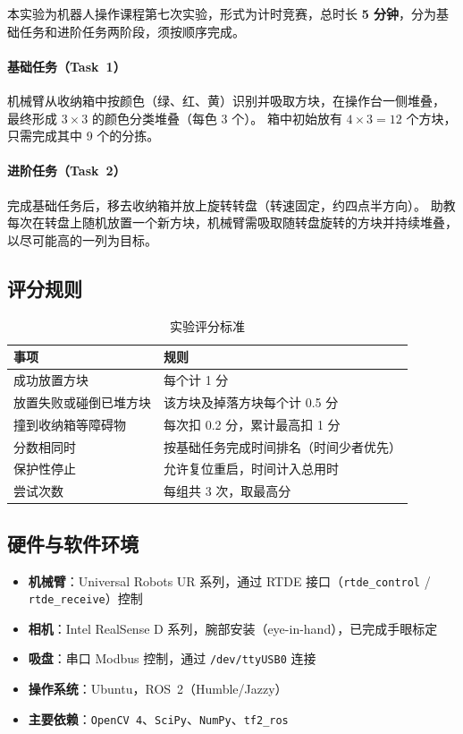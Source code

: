 \documentclass[12pt,a4paper]{article}
\begin{document}
本实验为机器人操作课程第七次实验，形式为计时竞赛，总时长 \textbf{5 分钟}，分为基础任务和进阶任务两阶段，须按顺序完成。

\paragraph{基础任务（Task~1）}
机械臂从收纳箱中按颜色（绿、红、黄）识别并吸取方块，在操作台一侧堆叠，
最终形成 $3\times3$ 的颜色分类堆叠（每色 3 个）。
箱中初始放有 $4\times3=12$ 个方块，只需完成其中 9 个的分拣。

\paragraph{进阶任务（Task~2）}
完成基础任务后，移去收纳箱并放上旋转转盘（转速固定，约四点半方向）。
助教每次在转盘上随机放置一个新方块，机械臂需吸取随转盘旋转的方块并持续堆叠，
以尽可能高的一列为目标。

\subsection{评分规则}

\begin{table}[H]
  \centering
  \caption{实验评分标准}
  \label{tab:scoring}
  \begin{tabularx}{\textwidth}{lX}
    \toprule
    \textbf{事项} & \textbf{规则} \\
    \midrule
    成功放置方块       & 每个计 1 分 \\
    放置失败或碰倒已堆方块 & 该方块及掉落方块每个计 0.5 分 \\
    撞到收纳箱等障碍物 & 每次扣 0.2 分，累计最高扣 1 分 \\
    分数相同时         & 按基础任务完成时间排名（时间少者优先） \\
    保护性停止         & 允许复位重启，时间计入总用时 \\
    尝试次数           & 每组共 3 次，取最高分 \\
    \bottomrule
  \end{tabularx}
\end{table}

\subsection{硬件与软件环境}

\begin{itemize}[noitemsep]
  \item \textbf{机械臂}：Universal Robots UR 系列，通过 RTDE 接口（\texttt{rtde\_control} / \texttt{rtde\_receive}）控制
  \item \textbf{相机}：Intel RealSense D 系列，腕部安装（eye-in-hand），已完成手眼标定
  \item \textbf{吸盘}：串口 Modbus 控制，通过 \texttt{/dev/ttyUSB0} 连接
  \item \textbf{操作系统}：Ubuntu，ROS~2（Humble/Jazzy）
  \item \textbf{主要依赖}：\texttt{OpenCV~4}、\texttt{SciPy}、\texttt{NumPy}、\texttt{tf2\_ros}
\end{itemize}
\end{document}
